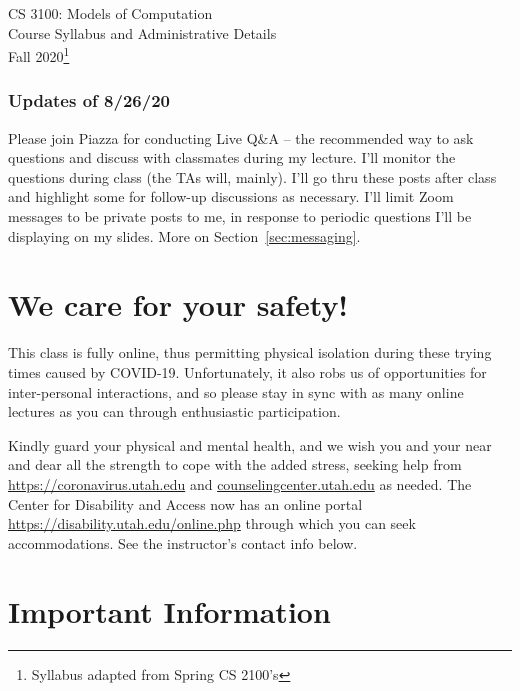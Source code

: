 \documentclass[12pt]{article}
\begin{document}
\begin{center}
{\Large CS 3100: Models of Computation  \\ Course Syllabus and Administrative Details\\
\vspace{2mm}
Fall 2020}\footnote{Syllabus adapted from Spring CS 2100's}
\end{center}

\begin{sl}
\subsubsection*{Updates of 8/26/20}
Please join Piazza for conducting Live Q\&A -- the recommended
way to ask questions and
discuss with classmates during my lecture.
%
I'll monitor the questions during class (the TAs will, mainly).
%
I'll go thru these posts after class
and highlight some for follow-up discussions as necessary.
%
I'll limit Zoom messages to be private posts to me, in response to
periodic questions I'll be displaying on my slides. More on
Section~\ref{sec:messaging}.
\end{sl}

\section{We care for your safety!}

This class is fully online, thus permitting
physical isolation during these trying times
caused by COVID-19.
%
Unfortunately, it also robs us of opportunities
for inter-personal interactions, and so please stay
in sync with as many online lectures as you can through
enthusiastic participation.


Kindly guard your physical and mental health, and we wish you
and your near and dear all the strength to cope
with the added stress,
seeking help from
\url{https://coronavirus.utah.edu} and
\url{counselingcenter.utah.edu}
as needed.
%
The Center for Disability and Access now has an online portal
\url{https://disability.utah.edu/online.php}
through which you can seek accommodations.
%
See the instructor's contact info below.



\section{Important Information}
\end{document}
